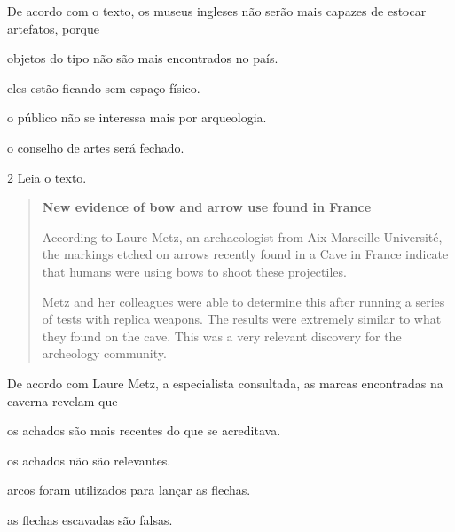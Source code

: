 De acordo com o texto, os museus ingleses não serão mais capazes de
estocar artefatos, porque

\begin{escolha}
\item objetos do tipo não são mais encontrados no país.

\item eles estão ficando sem espaço físico.

\item o público não se interessa mais por arqueologia.

\item o conselho de artes será fechado.
\end{escolha}


\num{2} Leia o texto.

\begin{quote}
\textbf{New evidence of bow and arrow use found in France}

According to Laure Metz, an archaeologist from Aix-Marseille Université, the markings etched on arrows recently found in a Cave in France indicate that humans were using bows to shoot these projectiles.

Metz and her colleagues were able to determine this after running a series of tests with replica weapons. The results were extremely similar to what they found on the cave. This was a very relevant discovery for the archeology community.   

\end{quote}

De acordo com Laure Metz, a especialista consultada, as marcas encontradas na caverna revelam que

\begin{escolha}
\item os achados são mais recentes do que se acreditava.

\item os achados não são relevantes.

\item arcos foram utilizados para lançar as flechas.

\item as flechas escavadas são falsas.
\end{escolha}

